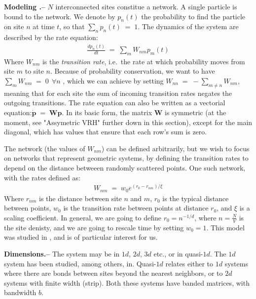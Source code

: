 \documentclass[onecolumn,fleqn,notitlepage,secnumarabic]{revtex4}
\begin{document}
{ \bf Modeling .-- } $N$ interconnected sites constitue a network. A single particle is bound to the network. We denote by $p_n(t)$ the probability to find the particle on site $n$ at time $t$, so that $\sum_n p_n(t) \;=\;1$. The dynamics of the system are described by the rate equation:
\begin{align}
\frac{dp_n(t)}{dt} \;=\; \sum_m W_{nm}p_m(t)
\end{align}
Where $W_{nm}$ is the \emph{transition rate}, i.e.\ the rate at which probability moves from site $m$ to site $n$.
Because of probability conservation, we want to have $\sum_m W_{nm} \;=\; 0 \ \ \forall n$ , which we can achieve by setting $W_{nn} \;=\; -\sum_{m\ne n} W_{nm} $, meaning that for each site the sum of incoming transition rates negates the outgoing transitions.
The rate equation can also be written as a vectorial equation:$\boldsymbol{ \dot p } \;=\; \boldsymbol{W} \boldsymbol{p}$. In its basic form, the matrix $\boldsymbol{W}$ is symmetric (at the moment, see "Assymetric VRH" further down in this section), except for the main diagonal, which has values that ensure that each row's sum is zero.

The network (the values of $W_{nm}$) can be defined arbitrarily, but we wish to focus on networks that represent geometric systems, by defining the transition rates to depend on the distance betweeen randomly scattered points\cite{Mezard:1999:NPB}. One such network, with the rates defined as:
\begin{align} \label{eq:exp_rates}
  W_{nm}\;=\; w_0 e^{(r_0-r_{nm})/ \xi}
\end{align}
Where $r_{nm}$ is the distance between site $n$ and $m$, $r_0$ is the typical distance between points, $w_0$ is the transition rate between points at distance $r_0$, and $\xi$ is a scaling coefficient. In general, we are going to define $r_0 = n^{-1/d}$, where $n=\frac{N}{V}$ is the site denisty, and we are going to rescale time by setting $w_0=1$. This model was studied in \cite{Amir:2010:PRL}, and is of particular interest for us.

{ \bf Dimensions.-- } The system may be in $1d$, $2d$, $3d$ etc., or in quasi-$1d$. The $1d$ system has been studied, among others, in\cite{Parris:1986}\cite{Alexander:1981:RMP}\cite{AslangulChvosta:1995}.  Quasi-$1d$ relates either to $1d$ systems where there are bonds between sites beyond the nearest neighbors, or to $2d$ systems with finite width (strip). Both these systems have banded matrices, with bandwidth $b$.
\end{document}
